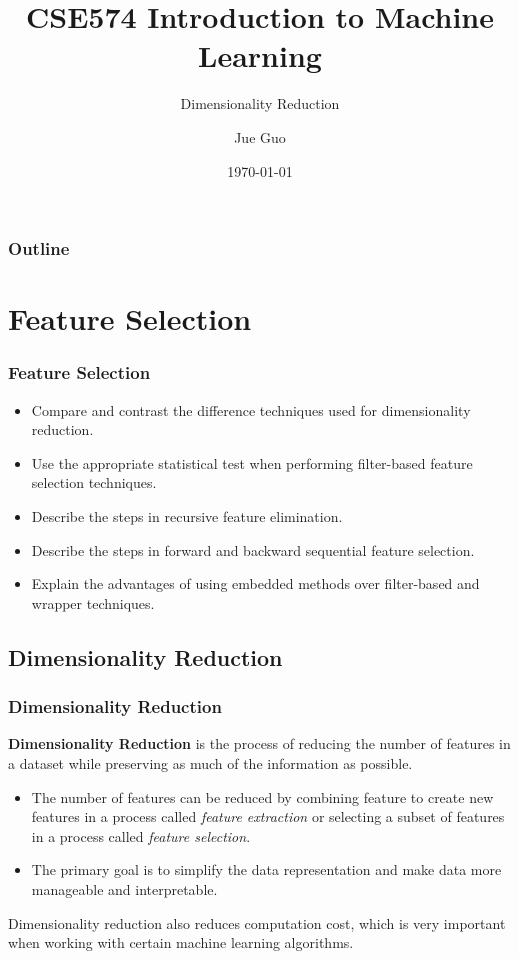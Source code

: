 \documentclass[8pt,dvipsnames]{beamer}
\title{CSE574 Introduction to Machine Learning}
\subtitle{Dimensionality Reduction}
\author{Jue Guo}
\institute{University at Buffalo}
\date{\today}
\begin{document}
\begin{frame}
    \titlepage
\end{frame}
\begin{frame}
    \frametitle{Outline}
    \tableofcontents
\end{frame}

\section{Feature Selection}
\begin{frame}
    \frametitle{Feature Selection}
    \begin{itemize}
        \item Compare and contrast the difference techniques used for dimensionality reduction.
        \item Use the appropriate statistical test when performing filter-based feature selection techniques.
        \item Describe the steps in recursive feature elimination.
        \item Describe the steps in forward and backward sequential feature selection.
        \item Explain the advantages of using embedded methods over filter-based and wrapper techniques.
    \end{itemize}
\end{frame}

\subsection{Dimensionality Reduction}
\begin{frame}
    \frametitle{Dimensionality Reduction}
    \textbf{Dimensionality Reduction} is the process of reducing the number of features in a dataset while preserving as much of the information as possible.
    \begin{itemize}
        \item The number of features can be reduced by combining feature to create new features in a process called \textit{feature extraction} or selecting a subset of features in a process called \textit{feature selection}.
        \item The primary goal is to simplify the data representation and make data more manageable and interpretable.
    \end{itemize}
    Dimensionality reduction also reduces computation cost, which is very important when working with certain machine learning algorithms.
\end{frame}
\end{document}
